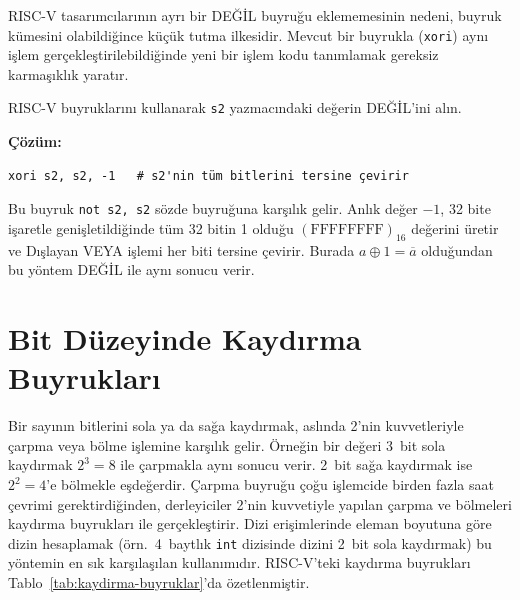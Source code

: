 RISC-V tasarımcılarının ayrı bir DEĞİL buyruğu eklememesinin nedeni, buyruk kümesini olabildiğince küçük tutma ilkesidir. Mevcut bir buyrukla (\texttt{xori}) aynı işlem gerçekleştirilebildiğinde yeni bir işlem kodu tanımlamak gereksiz karmaşıklık yaratır.

\begin{ornek}[3.13]
RISC-V buyruklarını kullanarak \texttt{s2} yazmacındaki değerin DEĞİL'ini alın.

\textbf{Çözüm:}
\begin{lstlisting}[style=riscv]
xori s2, s2, -1   # s2'nin tüm bitlerini tersine çevirir
\end{lstlisting}

Bu buyruk \texttt{not s2, s2} sözde buyruğuna karşılık gelir. Anlık değer $-1$, 32 bite işaretle genişletildiğinde tüm 32 bitin 1 olduğu $(\text{FFFFFFFF})_{16}$ değerini üretir ve Dışlayan VEYA işlemi her biti tersine çevirir. Burada $a \oplus 1 = \overline{a}$ olduğundan bu yöntem DEĞİL ile aynı sonucu verir.
\end{ornek}


\section{Bit Düzeyinde Kaydırma Buyrukları}
\label{sec:kaydirma-buyruklar}

Bir sayının bitlerini sola ya da sağa kaydırmak, aslında 2'nin kuvvetleriyle çarpma veya bölme işlemine karşılık gelir. Örneğin bir değeri 3~bit sola kaydırmak $2^3 = 8$ ile çarpmakla aynı sonucu verir. 2~bit sağa kaydırmak ise $2^2 = 4$'e bölmekle eşdeğerdir. Çarpma buyruğu çoğu işlemcide birden fazla saat çevrimi gerektirdiğinden, derleyiciler 2'nin kuvvetiyle yapılan çarpma ve bölmeleri kaydırma buyrukları ile gerçekleştirir. Dizi erişimlerinde eleman boyutuna göre dizin hesaplamak (örn.\ 4~baytlık \texttt{int} dizisinde dizini 2~bit sola kaydırmak) bu yöntemin en sık karşılaşılan kullanımıdır. RISC-V'teki kaydırma buyrukları Tablo~\ref{tab:kaydirma-buyruklar}'da özetlenmiştir.

